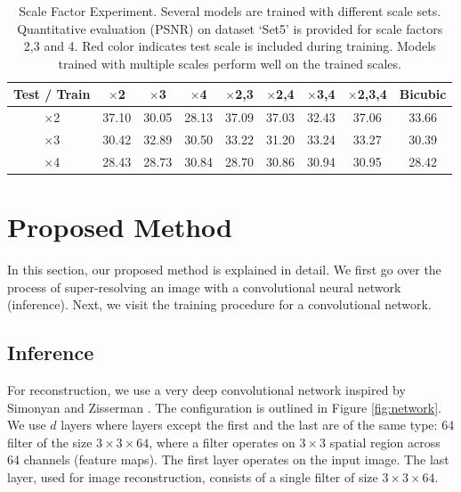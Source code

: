 \documentclass[10pt,twocolumn,letterpaper]{article}
\begin{document}
\begin{table}[t]
	\small
	\centering
\begin{tabular}
{|c|c|c|c|c|c|c|c||c|}
\hline 
 Test / Train & {$\times$2}& {$\times$3}& { $\times$4}& {$\times$2,3}& {$\times$2,4}& { $\times$3,4}& {$\times$2,3,4} & {Bicubic} \\
\hline
$\times$2  & \color{red} 37.10  & 30.05  & 28.13  & \color{red} 37.09  & \color{red} 37.03  & 32.43  & \color{red}37.06 &33.66   \\
$\times$3  & 30.42  & \color{red} 32.89  & 30.50  & \color{red} 33.22  & 31.20  & \color{red} 33.24  & \color{red} 33.27  & 30.39 \\
$\times$4  & 28.43  & 28.73  & \color{red} 30.84  & 28.70  & \color{red} 30.86  & \color{red} 30.94  & \color{red} 30.95 & 28.42  \\
\hline
\end{tabular}
	\vspace{1pt}
	\caption{Scale Factor Experiment. Several models are trained with different scale sets. Quantitative evaluation (PSNR) on dataset `Set5' is provided for scale factors 2,3 and 4.  {\color{red}Red color} indicates test scale is included during training. Models trained with multiple scales perform well on the trained scales. }
	\label{tab:SRCNN_Factor_Test}
\end{table}

\section{Proposed Method}
In this section, our proposed method is explained in detail. We first go over the process of super-resolving an image with a convolutional neural network (inference). Next, we visit the training procedure for a convolutional network.
\subsection{Inference}

For reconstruction, we use a very deep convolutional network inspired by Simonyan and Zisserman \cite{simonyan2015very}. The configuration is outlined in Figure \ref{fig:network}. We use $d$ layers where layers except the first and the last are of the same type: 64 filter of the size $3\times 3 \times64$, where a filter operates on $3\times3$ spatial region across 64 channels (feature maps). The first layer operates on the input image. The last layer, used for image reconstruction, consists of a single filter of size $3\times 3 \times64$.
\end{document}
